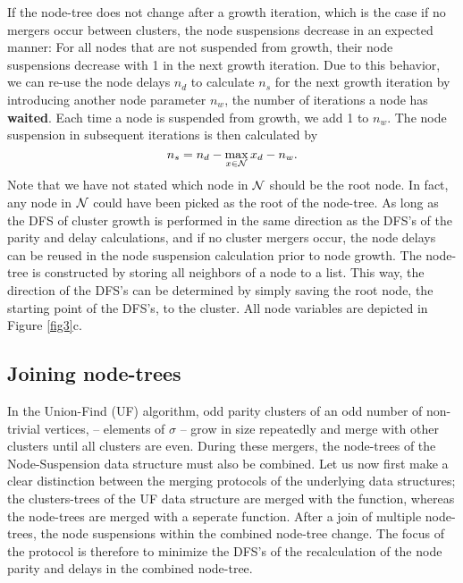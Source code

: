 If the node-tree does not change after a growth iteration, which is the case if no mergers occur between clusters, the node suspensions decrease in an expected manner: For all nodes that are not suspended from growth, their node suspensions decrease with 1 in the next growth iteration. Due to this behavior, we can re-use the node delays $n_d$ to calculate $n_s$ for the next growth iteration by introducing another node parameter $n_w$, the number of iterations a node has \textbf{waited}. Each time a node is suspended from growth, we add 1 to $n_w$. The node suspension in subsequent iterations is then calculated by
\begin{equation}\label{eq:suspension}
    n_s = n_d - \max_{x \in \nset}{x_d} - n_w. 
\end{equation}
Note that we have not stated which node in $\mathcal{N}$ should be the root node. In fact, any node in $\mathcal{N}$ could have been picked as the root of the node-tree. As long as the DFS of cluster growth is performed in the same direction as the DFS's of the parity and delay calculations, and if no cluster mergers occur, the node delays can be reused in the node suspension calculation prior to node growth. 
The node-tree is constructed by storing all neighbors of a node to a list. This way, the direction of the DFS's can be determined by simply saving the root node, the starting point of the DFS's, to the cluster. All node variables are depicted in Figure \ref{fig3}c. 


\subsection{Joining node-trees}\label{sec:nodejoin}

In the Union-Find (UF) algorithm, odd parity clusters of an odd number of non-trivial vertices, -- elements of $\sigma$ -- grow in size repeatedly and merge with other clusters until all clusters are even. During these mergers, the node-trees of the Node-Suspension data structure must also be combined. Let us now first make a clear distinction between the merging protocols of the underlying data structures; the clusters-trees of the UF data structure are merged with the  function, whereas the node-trees are merged with a seperate  function. After a join of multiple node-trees, the node suspensions within the combined node-tree change. The focus of the  protocol is therefore to minimize the DFS's of the recalculation of the node parity and delays in the combined node-tree. 

